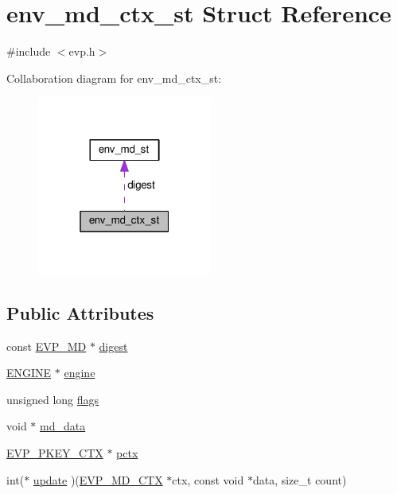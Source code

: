 \hypertarget{structenv__md__ctx__st}{}\section{env\+\_\+md\+\_\+ctx\+\_\+st Struct Reference}
\label{structenv__md__ctx__st}


{\ttfamily \#include $<$evp.\+h$>$}



Collaboration diagram for env\+\_\+md\+\_\+ctx\+\_\+st\+:
\nopagebreak
\begin{figure}[H]
\begin{center}
\leavevmode
\includegraphics[width=163pt]{structenv__md__ctx__st__coll__graph}
\end{center}
\end{figure}
\subsection*{Public Attributes}
\begin{DoxyCompactItemize}
\item 
const \hyperlink{ossl__typ_8h_aac66cf010326fa9a927c2a34888f45d3}{E\+V\+P\+\_\+\+MD} $\ast$ \hyperlink{structenv__md__ctx__st_a5cd23227051f7f605039f24f105f0dea}{digest}
\item 
\hyperlink{ossl__typ_8h_abac45b251498719318e60ab8d6192510}{E\+N\+G\+I\+NE} $\ast$ \hyperlink{structenv__md__ctx__st_aa74b6022586da8be425ea8eb897a8130}{engine}
\item 
unsigned long \hyperlink{structenv__md__ctx__st_aae521b439879e6584b766d7703741d43}{flags}
\item 
void $\ast$ \hyperlink{structenv__md__ctx__st_a9e1598967116d321673826a7909e7efa}{md\+\_\+data}
\item 
\hyperlink{ossl__typ_8h_aaadbb75633e4460a52864970a3b875de}{E\+V\+P\+\_\+\+P\+K\+E\+Y\+\_\+\+C\+TX} $\ast$ \hyperlink{structenv__md__ctx__st_aaf0d8bf6f34617159fd263074a07a555}{pctx}
\item 
int($\ast$ \hyperlink{structenv__md__ctx__st_a55517be3f51260fe504e146b9b651d60}{update} )(\hyperlink{ossl__typ_8h_a69cda4d21bd068f01c469222c1dd92fe}{E\+V\+P\+\_\+\+M\+D\+\_\+\+C\+TX} $\ast$ctx, const void $\ast$data, size\+\_\+t count)
\end{DoxyCompactItemize}


